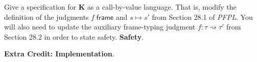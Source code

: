 \documentclass[12pt]{exam}
\newcommand{\typ}{\ensuremath{\mathit{\tau}}}
\newcommand{\kframe}{\ensuremath{f}}
\newcommand{\kstate}{\ensuremath{s}}
\newcommand{\K}{\textbf{\textsf{K}}\xspace}
\newcommand{\hasType}[2]{\ensuremath{#1 : #2}}
\newcommand{\isOk}[1]{\ensuremath{#1\;\mathsf{ok}}}
\newcommand{\step}[2]{\ensuremath{#1 \longmapsto #2}}
\newcommand{\isFinal}[1]{\ensuremath{#1\;\mathsf{final}}}
\newcommand{\isFrame}[1]{\ensuremath{#1\;\mathsf{frame}}}
\newcommand{\frameType}[3]{\hasType{#1}{#2 \rightsquigarrow #3}}
\begin{document}
\begin{questions}
  \question Give a specification for \K as a call-by-value language. That is, modify the definition of the judgments $\isFrame{\kframe}$ and $\step{\kstate}{\kstate'}$ from Section 28.1 of \emph{PFPL}. You will also need to update the auxiliary frame-typing judgment $\frameType{\kframe}{\typ}{\typ'}$ from Section 28.2 in order to state safety.
  \question \textbf{Safety}.
  \question \textbf{Extra Credit: Implementation}.
\end{questions}
\end{document}
